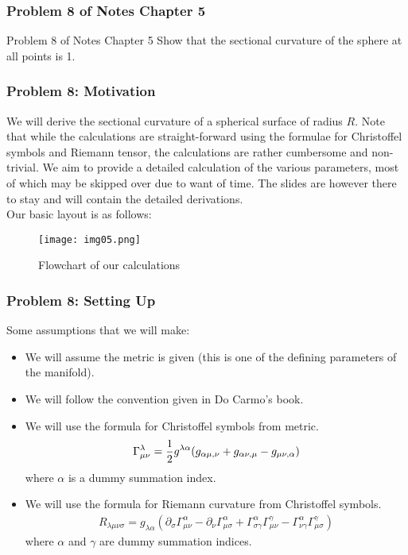 \begin{frame}
\frametitle{Problem 8 of Notes Chapter 5}
\begin{block}{Problem 8 of Notes Chapter 5}
Show that the sectional curvature of the sphere at all points is 1.
\end{block}
\end{frame}

\begin{frame}
\frametitle{Problem 8: Motivation}
We will derive the sectional curvature of a spherical surface of radius $R$. Note that while the calculations are straight-forward using the formulae for Christoffel symbols and Riemann tensor, the calculations are rather cumbersome and non-trivial. We aim to provide a detailed calculation of the various parameters, most of which may be skipped over due to want of time. The slides are however there to stay and will contain the detailed derivations.\\
\pause
Our basic layout is as follows:\\
\begin{figure}[!htb]
	\centering
   \begin{minipage}{0.8\textwidth}
     \centering
     \texttt{[image: img05.png]}
     \caption{{Flowchart of our calculations}}
     \label{fig:05}
   \end{minipage}
\end{figure}
\end{frame}

\begin{frame}
\frametitle{Problem 8: Setting Up}
Some assumptions that we will make:
\begin{itemize}
\item We will assume the metric is given (this is one of the defining parameters of the manifold).\pause
\item We will follow the convention given in Do Carmo's book.\pause
\item We will use the formula for Christoffel symbols from metric.
\begin{align}
\label{christoffel symbols}
\Gamma^{\lambda}_{\mu\nu}=\frac{\displaystyle 1}{\displaystyle 2}g^{\lambda\alpha}(g_{\alpha\mu ,\nu}+g_{\alpha\nu ,\mu}-g_{\mu\nu ,\alpha})
\end{align}
where $\alpha$ is a dummy summation index.\pause
\item We will use the formula for Riemann curvature from Christoffel symbols.
\begin{align}
\label{riemann curvature tensor}
R_{\lambda\mu\nu\sigma}=g_{\lambda\alpha}(\partial_\sigma\Gamma^{\alpha}_{\mu\nu}-\partial_\nu\Gamma^{\alpha}_{\mu\sigma}+\Gamma^{\alpha}_{\sigma\gamma}\Gamma^{\gamma}_{\mu\nu}-\Gamma^{\alpha}_{\nu\gamma}\Gamma^{\gamma}_{\mu\sigma})
\end{align}
where $\alpha$ and $\gamma$ are dummy summation indices.
\end{itemize}
\end{frame}

